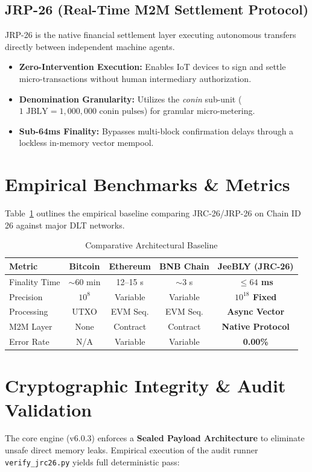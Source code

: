 \documentclass[10pt,journal,compsoc]{IEEEtran}
\begin{document}
\subsection{JRP-26 (Real-Time M2M Settlement Protocol)}
JRP-26 is the native financial settlement layer executing autonomous transfers directly between independent machine agents.
\begin{itemize}
    \item \textbf{Zero-Intervention Execution:} Enables IoT devices to sign and settle micro-transactions without human intermediary authorization.
    \item \textbf{Denomination Granularity:} Utilizes the \textit{conin} sub-unit ($1\text{ JBLY} = 1,000,000\text{ conin pulses}$) for granular micro-metering.
    \item \textbf{Sub-64ms Finality:} Bypasses multi-block confirmation delays through a lockless in-memory vector mempool.
\end{itemize}

\section{Empirical Benchmarks \& Metrics}

Table~\ref{tab:comparison} outlines the empirical baseline comparing JRC-26/JRP-26 on Chain ID 26 against major DLT networks.

\begin{table}[htbp]
\caption{Comparative Architectural Baseline}
\label{tab:comparison}
\centering
\begin{tabular}{lcccc}
\toprule
\textbf{Metric} & \textbf{Bitcoin} & \textbf{Ethereum} & \textbf{BNB Chain} & \textbf{JeeBLY (JRC-26)} \\
\midrule
Finality Time & $\sim 60$ min & 12--15 s & $\sim 3$ s & \textbf{$\le 64$ ms} \\
Precision & $10^8$ & Variable & Variable & \textbf{$10^{18}$ Fixed} \\
Processing & UTXO & EVM Seq. & EVM Seq. & \textbf{Async Vector} \\
M2M Layer & None & Contract & Contract & \textbf{Native Protocol} \\
Error Rate & N/A & Variable & Variable & \textbf{0.00\%} \\
\bottomrule
\end{tabular}
\end{table}

\section{Cryptographic Integrity \& Audit Validation}
The core engine (v6.0.3) enforces a \textbf{Sealed Payload Architecture} to eliminate unsafe direct memory leaks. Empirical execution of the audit runner \texttt{verify\_jrc26.py} yields full deterministic pass:
\end{document}
